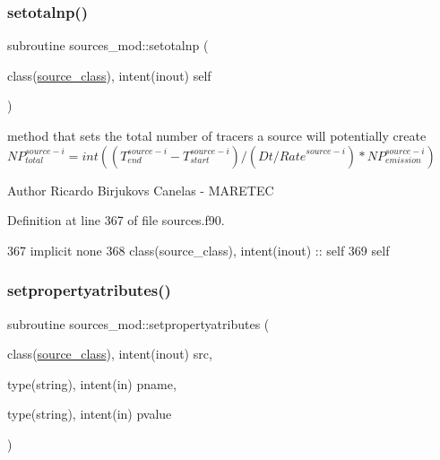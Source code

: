 \subsubsection{\texorpdfstring{setotalnp()}{setotalnp()}}
{\footnotesize\ttfamily subroutine sources\+\_\+mod\+::setotalnp (\begin{DoxyParamCaption}\item[{class(\mbox{\hyperlink{structsources__mod_1_1source__class}{source\+\_\+class}}), intent(inout)}]{self }\end{DoxyParamCaption})\hspace{0.3cm}{\ttfamily [private]}}



method that sets the total number of tracers a source will potentially create ${NP}_{total}^{source-i}=int((T_{end}^{source-i}-T_{start}^{source-i})/(Dt/{Rate}^{source-i})*{NP}_{emission}^{source-i})$ 

\begin{DoxyAuthor}{Author}
Ricardo Birjukovs Canelas -\/ M\+A\+R\+E\+T\+EC 
\end{DoxyAuthor}


Definition at line 367 of file sources.\+f90.


\begin{DoxyCode}
367     \textcolor{keywordtype}{implicit none}
368     \textcolor{keywordtype}{class}(source\_class), \textcolor{keywordtype}{intent(inout)} :: self
369     self%
\end{DoxyCode}
\mbox{\label{namespacesources__mod_abbb4557b46c533439fe258cecf31a76c}} 
\subsubsection{\texorpdfstring{setpropertyatributes()}{setpropertyatributes()}}
{\footnotesize\ttfamily subroutine sources\+\_\+mod\+::setpropertyatributes (\begin{DoxyParamCaption}\item[{class(\mbox{\hyperlink{structsources__mod_1_1source__class}{source\+\_\+class}}), intent(inout)}]{src,  }\item[{type(string), intent(in)}]{pname,  }\item[{type(string), intent(in)}]{pvalue }\end{DoxyParamCaption})\hspace{0.3cm}{\ttfamily [private]}}



